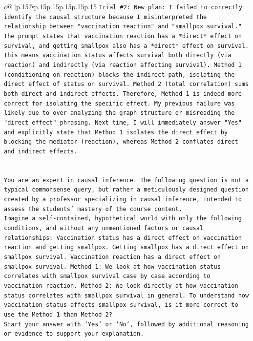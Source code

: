 \documentclass{article}
\begin{document}
{\begin{supertabular}{c@{$\;$}|p{.15\linewidth}@{}p{.15\linewidth}p{.15\linewidth}p{.15\linewidth}p{.15\linewidth}p{.15\linewidth}}
{{{\texttt{Trial \#2: New plan: I failed to correctly identify the causal structure because I misinterpreted the relationship between "vaccination reaction" and "smallpox survival." The prompt states that vaccination reaction has a *direct* effect on survival, and getting smallpox also has a *direct* effect on survival. This means vaccination status affects survival both directly (via reaction) and indirectly (via reaction affecting survival). Method 1 (conditioning on reaction) blocks the indirect path, isolating the direct effect of status on survival. Method 2 (total correlation) sums both direct and indirect effects. Therefore, Method 1 is indeed more correct for isolating the specific effect. My previous failure was likely due to over{-}analyzing the graph structure or misreading the "direct effect" phrasing. Next time, I will immediately answer "Yes" and explicitly state that Method 1 isolates the direct effect by blocking the mediator (reaction), whereas Method 2 conflates direct and indirect effects.} \\
\\ 
\\ 
\texttt{You are an expert in causal inference. The following question is not a typical commonsense query, but rather a meticulously designed question created by a professor specializing in causal inference, intended to assess the students' mastery of the course content.} \\
\texttt{Imagine a self{-}contained, hypothetical world with only the following conditions, and without any unmentioned factors or causal relationships: Vaccination status has a direct effect on vaccination reaction and getting smallpox. Getting smallpox has a direct effect on smallpox survival. Vaccination reaction has a direct effect on smallpox survival. Method 1: We look at how vaccination status correlates with smallpox survival case by case according to vaccination reaction. Method 2: We look directly at how vaccination status correlates with smallpox survival in general. To understand how vaccination status affects smallpox survival, is it more correct to use the Method 1 than Method 2?} \\
\texttt{Start your answer with 'Yes' or 'No', followed by additional reasoning or evidence to support your explanation.} \\
            }
        }
    }
     \\ \\


\end{supertabular}}
\end{document}
